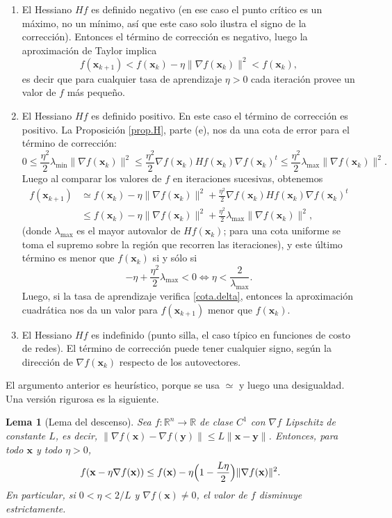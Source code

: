 \documentclass[12pt, a4paper]{amsbook}
\newcommand{\R}{{\mathbb R}}
\newcommand{\xx}{{\mathbf x}}
\newcommand{\yy}{{\mathbf y}}
\newtheorem{lema}[teo]{Lema}
\theoremstyle{remark}
\theoremstyle{definition}
\numberwithin{section}{chapter}
\numberwithin{subsection}{section}
\numberwithin{equation}{section}
\numberwithin{figure}{chapter}
\begin{document}
\begin{enumerate}
\item El Hessiano $Hf$ es definido negativo (en ese caso el punto crítico es un máximo, no un mínimo, así que este caso solo ilustra el signo de la corrección). Entonces el término de corrección es negativo, luego la aproximación de Taylor implica
$$
f(\xx_{k+1}) < f(\xx_k) - \eta \|\nabla f(\xx_k)\|^2 < f(\xx_k),
$$
es decir que para cualquier tasa de aprendizaje $\eta>0$ cada iteración provee un valor de $f$ más pequeño.

\item El Hessiano $Hf$ es definido positivo. En este caso el término de corrección es positivo. La Proposición \ref{prop.H}, parte (e), nos da una cota de error para el término de corrección:
$$
0\le \frac{\eta^2}{2} \lambda_\text{min} \|\nabla f(\xx_k)\|^2 \le \frac{\eta^2}{2}  \nabla f(\xx_k) Hf(\xx_k) \nabla f(\xx_k)^t \le \frac{\eta^2}{2} \lambda_\text{max} \|\nabla f(\xx_k)\|^2.
$$
Luego al comparar los valores de $f$ en iteraciones sucesivas, obtenemos
\begin{align*}
f(\xx_{k+1}) &\simeq f(\xx_k) - \eta \|\nabla f(\xx_k)\|^2 + \frac{\eta^2}{2} \nabla f(\xx_k) Hf(\xx_k) \nabla f(\xx_k)^t\\
&\le f(\xx_k) - \eta \|\nabla f(\xx_k)\|^2 + \frac{\eta^2}{2} \lambda_\text{max} \|\nabla f(\xx_k)\|^2,
\end{align*}
(donde $\lambda_\text{max}$ es el mayor autovalor de $Hf(\xx_k)$; para una cota uniforme se toma el supremo sobre la región que recorren las iteraciones), y este último término es menor que $f(\xx_k)$ si y sólo si
\begin{equation}\label{cota.delta}
-\eta + \frac{\eta^2}{2}\lambda_\text{max} <0 \iff \eta < \frac{2}{\lambda_\text{max}}.
\end{equation}
Luego, si la tasa de aprendizaje verifica \eqref{cota.delta}, entonces la aproximación cuadrática nos da un valor para $f(\xx_{k+1})$ menor que $f(\xx_k)$.

\item El Hessiano $Hf$ es indefinido (punto silla, el caso típico en funciones de costo de redes). El término de corrección puede tener cualquier signo, según la dirección de $\nabla f(\xx_k)$ respecto de los autovectores.
\end{enumerate}
El argumento anterior es heurístico, porque se usa $\simeq$ y luego una desigualdad. Una versión rigurosa es la siguiente.
\begin{lema}[Lema del descenso]\label{lema.descenso}
Sea $f\colon\R^n\to\R$ de clase $C^1$ con $\nabla f$ Lipschitz de constante $L$, es decir, $\|\nabla f(\xx)-\nabla f(\yy)\|\le L\|\xx-\yy\|$. Entonces, para todo $\xx$ y todo $\eta>0$,
$$
f(\xx-\eta\nabla f(\xx))\le f(\xx)-\eta\Bigl(1-\frac{L\eta}{2}\Bigr)\|\nabla f(\xx)\|^2.
$$
En particular, si $0<\eta<2/L$ y $\nabla f(\xx)\ne0$, el valor de $f$ disminuye estrictamente.
\end{lema}
\end{document}
